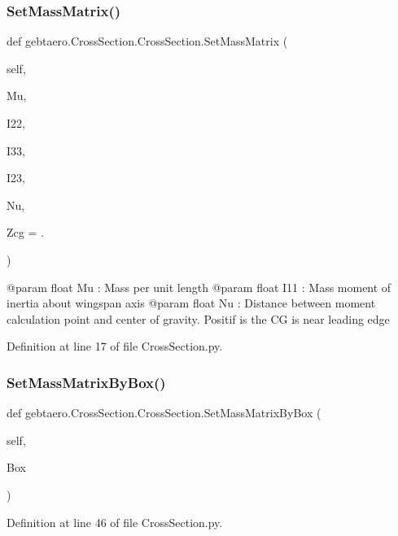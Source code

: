 \subsubsection{\texorpdfstring{Set\+Mass\+Matrix()}{SetMassMatrix()}}
{\footnotesize\ttfamily def gebtaero.\+Cross\+Section.\+Cross\+Section.\+Set\+Mass\+Matrix (\begin{DoxyParamCaption}\item[{}]{self,  }\item[{}]{Mu,  }\item[{}]{I22,  }\item[{}]{I33,  }\item[{}]{I23,  }\item[{}]{Nu,  }\item[{}]{Zcg = {.} }\end{DoxyParamCaption})}

\begin{DoxyVerb}@param float Mu : Mass per unit length
@param float I11 : Mass moment of inertia about wingspan axis
@param float Nu : Distance between moment calculation point and center of gravity. Positif is the CG is near leading edge
\end{DoxyVerb}
 

Definition at line 17 of file Cross\+Section.\+py.

\mbox{\label{classgebtaero_1_1_cross_section_1_1_cross_section_a4914caf35d9b8cfadafe8e359a590d7c}} 
\subsubsection{\texorpdfstring{Set\+Mass\+Matrix\+By\+Box()}{SetMassMatrixByBox()}}
{\footnotesize\ttfamily def gebtaero.\+Cross\+Section.\+Cross\+Section.\+Set\+Mass\+Matrix\+By\+Box (\begin{DoxyParamCaption}\item[{}]{self,  }\item[{}]{Box }\end{DoxyParamCaption})}



Definition at line 46 of file Cross\+Section.\+py.

